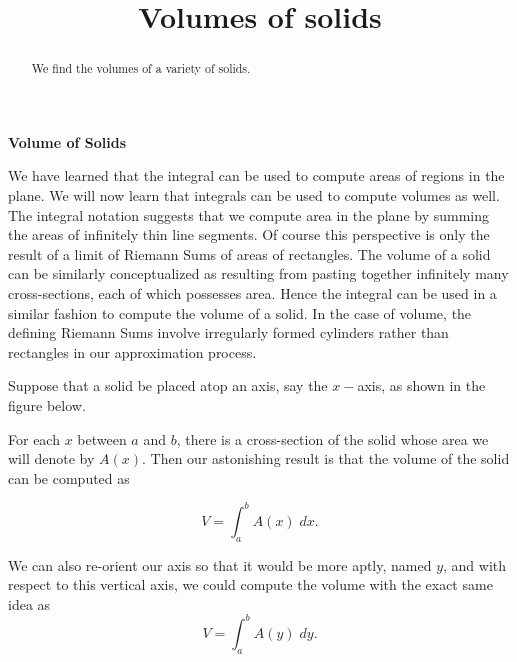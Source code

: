 \documentclass{ximera}
\title{Volumes of solids}
\begin{document}
\begin{abstract}
We find the volumes of a variety of solids.
\end{abstract}

\maketitle

\begin{center}
\textbf{Volume of Solids}
\end{center}

We have learned that the integral can be used to compute areas of regions in the plane.  
We will now learn that integrals can be used to compute volumes as well.
The integral notation suggests that we compute area in the plane by summing the areas of  infinitely thin line segments.
Of course this perspective is only the result of a limit of Riemann Sums of areas of rectangles.
The volume of a solid can be similarly conceptualized as resulting from pasting together infinitely many cross-sections,
each of which possesses area. Hence the integral can be used in a similar fashion to compute the volume of a solid.
In the case of volume, the defining Riemann Sums involve irregularly formed cylinders rather than rectangles
in our approximation process.



Suppose that a solid be placed atop an axis, say the $x-$axis, as shown in the figure below.


For each $x$ between $a$ and $b$, there is a cross-section of the solid whose area we will denote by $A(x)$.
Then our astonishing result is that the volume of the solid can be computed as

\[
V = \int_a^b A(x) \; dx.
\]

\begin{remark}
We can also re-orient our axis so that it would be more aptly, named $y$, and with respect to this vertical axis, 
we could compute the volume with the exact same idea as
\[
V = \int_a^b A(y) \; dy.
\]

\end{remark}

\end{document}

